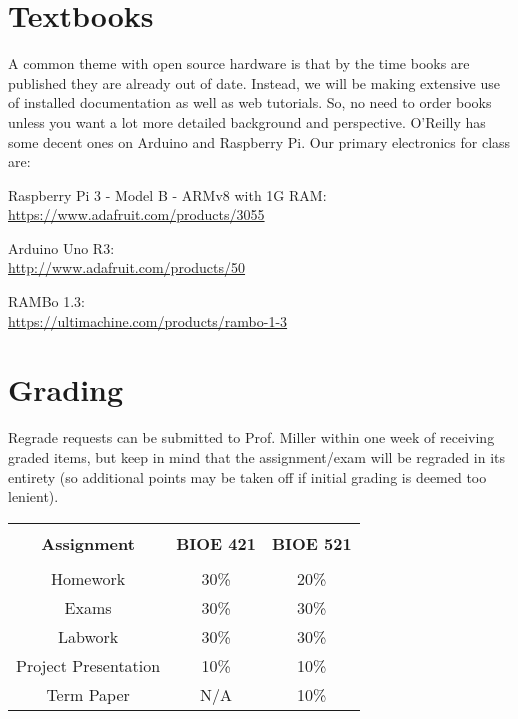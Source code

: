\documentclass[10pt]{article}
\begin{document}
\section*{Textbooks}
A common theme with open source hardware is that by the time books are published they are already out of date. Instead, we will be making extensive use of installed documentation as well as web tutorials. So, no need to order books unless you want a lot more detailed background and perspective. O'Reilly has some decent ones on Arduino and Raspberry Pi. Our primary electronics for class are:

Raspberry Pi 3 - Model B - ARMv8 with 1G RAM:\\
\href{https://www.adafruit.com/products/3055}{https://www.adafruit.com/products/3055}

Arduino Uno R3:\\
\href{http://www.adafruit.com/products/50}{http://www.adafruit.com/products/50}

RAMBo 1.3:\\
\href{https://ultimachine.com/products/rambo-1-3}{https://ultimachine.com/products/rambo-1-3}


\section*{Grading}

Regrade requests can be submitted to Prof. Miller within one week of receiving graded items, but keep in mind that the assignment/exam will be regraded in its entirety (so additional points may be taken off if initial grading is deemed too lenient).

\begin{table}[ht]
\begin{tabular}{c c c}
\hline\hline
\\[-1ex]
\textbf{Assignment} & \textbf{BIOE 421} & \textbf{BIOE 521} \\ [0.5ex]
\hline
\\[-1ex]
Homework				&	30\%	&	20\%	\\[1ex]
Exams				&	30\%	&	30\%	\\[1ex]
Labwork					&	30\%	&	30\%	\\[1ex]
Project Presentation	&	10\%	&	10\%	\\[1ex]
Term Paper				&	N/A		&	10\%	\\ [1ex]\hline
\end{tabular}
\label{table:nonlin}
\end{table}
\end{document}
